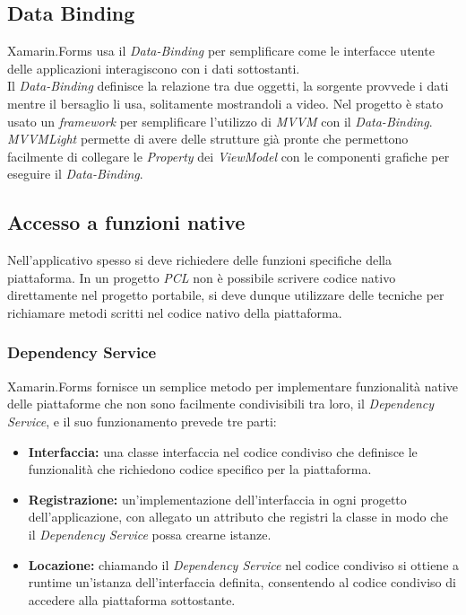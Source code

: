 \subsection{Data Binding}
Xamarin.Forms usa il \textit{Data-Binding} per semplificare come le interfacce utente delle applicazioni interagiscono con i dati sottostanti. 
\\
Il \textit{Data-Binding} definisce la relazione tra due oggetti, la sorgente provvede i dati mentre il bersaglio li usa, solitamente mostrandoli a video. Nel progetto è stato usato un \textit{framework} per semplificare l'utilizzo di \textit{MVVM} con il \textit{Data-Binding}. \textit{MVVMLight} permette di avere delle strutture già pronte che permettono facilmente di collegare le \textit{Property} dei \textit{ViewModel} con le componenti grafiche per eseguire il \textit{Data-Binding}.

\subsection{Accesso a funzioni native}
Nell'applicativo spesso si deve richiedere delle funzioni specifiche della piattaforma. In un progetto \textit{PCL} non è possibile scrivere codice nativo direttamente nel progetto portabile, si deve dunque utilizzare delle tecniche per richiamare metodi scritti nel codice nativo della piattaforma.
 
\subsubsection{Dependency Service}
Xamarin.Forms fornisce un semplice metodo per implementare funzionalità native delle piattaforme che non sono facilmente condivisibili tra loro, il \textit{Dependency Service}, e il suo funzionamento prevede tre parti:
\begin{itemize}
	\item \textbf{Interfaccia:} una classe interfaccia nel codice condiviso che definisce le funzionalità che richiedono codice specifico per la piattaforma.
	\item \textbf{Registrazione:} un'implementazione dell'interfaccia in ogni progetto dell'applicazione, con allegato un attributo che registri la classe in modo che il \textit{Dependency Service} possa crearne istanze.
	\item \textbf{Locazione:} chiamando il \textit{Dependency Service} nel codice condiviso si ottiene a runtime un'istanza dell'interfaccia definita, consentendo al codice condiviso di accedere alla piattaforma sottostante.
\end{itemize}

